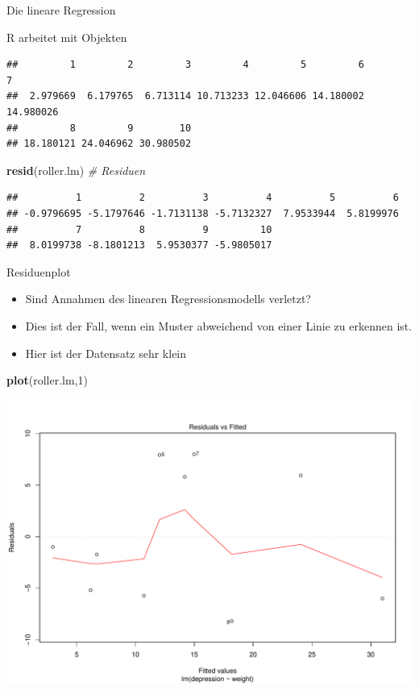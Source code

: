 \documentclass[ignorenonframetext,]{beamer}
\newenvironment{Shaded}{}{}
\newcommand{\KeywordTok}[1]{\textcolor[rgb]{0.00,0.44,0.13}{\textbf{{#1}}}}
\newcommand{\DecValTok}[1]{\textcolor[rgb]{0.25,0.63,0.44}{{#1}}}
\newcommand{\CommentTok}[1]{\textcolor[rgb]{0.38,0.63,0.69}{\textit{{#1}}}}
\newcommand{\NormalTok}[1]{{#1}}
\providecommand{\tightlist}{%
\setlength{\itemsep}{0pt}\setlength{\parskip}{0pt}}
\begin{document}
\begin{frame}[fragile]{Die lineare Regression}
\begin{block}{R arbeitet mit Objekten}
\begin{verbatim}
##         1         2         3         4         5         6         7 
##  2.979669  6.179765  6.713114 10.713233 12.046606 14.180002 14.980026 
##         8         9        10 
## 18.180121 24.046962 30.980502
\end{verbatim}

\begin{Shaded}
\begin{Highlighting}[]
\KeywordTok{resid}\NormalTok{(roller.lm) }\CommentTok{# Residuen}
\end{Highlighting}
\end{Shaded}

\begin{verbatim}
##          1          2          3          4          5          6 
## -0.9796695 -5.1797646 -1.7131138 -5.7132327  7.9533944  5.8199976 
##          7          8          9         10 
##  8.0199738 -8.1801213  5.9530377 -5.9805017
\end{verbatim}

\end{block}

\begin{block}{Residuenplot}

\begin{itemize}
\tightlist
\item
  Sind Annahmen des linearen Regressionsmodells verletzt?
\item
  Dies ist der Fall, wenn ein Muster abweichend von einer Linie zu
  erkennen ist.
\item
  Hier ist der Datensatz sehr klein
\end{itemize}

\begin{Shaded}
\begin{Highlighting}[]
\KeywordTok{plot}\NormalTok{(roller.lm,}\DecValTok{1}\NormalTok{)}
\end{Highlighting}
\end{Shaded}

\includegraphics{R_intern_files/figure-beamer/unnamed-chunk-295-1.pdf}


\end{block}
\end{frame}
\end{document}
